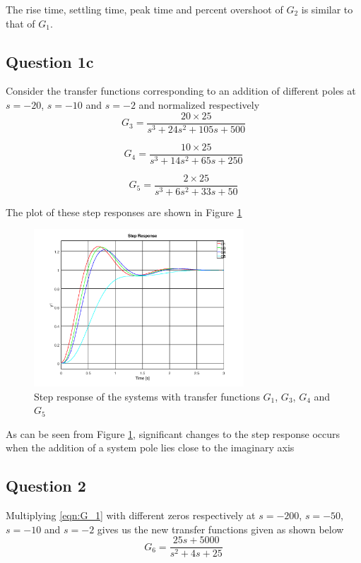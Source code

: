 \documentclass[12pt, a4paper]{article}
\begin{document}
			The rise time, settling time, peak time and percent overshoot of $G_2$ is similar to that of $G_1$.

		\subsection{Question 1c} %
		\label{sub:question_1c}
			Consider the transfer functions corresponding to an addition of different poles at $s=-20$, $s=-10$ and $s=-2$ and normalized respectively
			\begin{equation}
				G_3 = \frac{20 \times 25}{s^3 +24s^2+105s+500}
			\end{equation}

			\begin{equation}
				G_4 = \frac{10 \times 25}{s^3 +14s^2+65s+250}
			\end{equation}

			\begin{equation}
				G_5 = \frac{2 \times 25}{s^3 +6s^2+33s+50}
			\end{equation}

			The plot of these step responses are shown in Figure \ref{fig:step_pre_q1c}
			\begin{figure}[H]
				\centering
				\includegraphics[width=0.7\textwidth]{Images/step_pre_q1c.png}
				\caption{Step response of the systems with transfer functions $G_1$, $G_3$, $G_4$ and $G_5$}
				\label{fig:step_pre_q1c}
			\end{figure}

			As can be seen from Figure \ref{fig:step_pre_q1c}, significant changes to the step response occurs when the addition of a system pole lies close to the imaginary axis

			\subsection{Question 2} %
			\label{sub:question_2}
				Multiplying \eqref{eqn:G_1} with different zeros respectively at $s=-200$, $s=-50$,$s=-10$ and $s=-2$ gives us the new transfer functions given as shown below
				\begin{equation}
					G_6 = \frac{25s +5000}{s^2+4s+25}
					\label{eqn:G_6}
				\end{equation}
\end{document}
